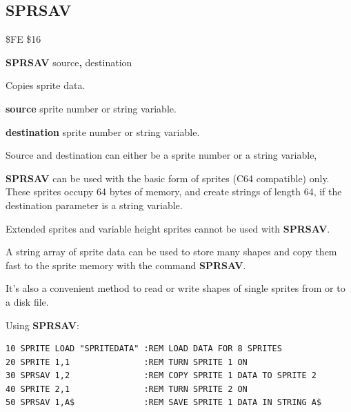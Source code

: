 
\newpage
\subsection{SPRSAV}
\begin{description}[leftmargin=2cm,style=nextline]
\item [Token:] \$FE \$16
\item [Format:] {\bf SPRSAV} source{\bf,} destination
\item [Usage:]  Copies sprite data.

                {\bf source} sprite number or string variable.

                {\bf destination} sprite number or string variable.

\item [Remarks:] Source and destination can either be
                a sprite number or a string variable,

                {\bf SPRSAV} can be used with the basic form of sprites
                (C64 compatible) only. These sprites occupy 64 bytes of memory,
                and create strings of length 64, if the destination
                parameter is a string variable.

                Extended sprites and variable height sprites
                cannot be used with {\bf SPRSAV}.

                A string array of sprite data can be used to store
                many shapes and copy them fast to the sprite memory
                with the command {\bf SPRSAV}.

                It's also a convenient method to read or write
                shapes of single sprites from or to a disk file.

\item [Example:] Using {\bf SPRSAV}:
\begin{tcolorbox}[colback=black,coltext=white]
\verbatimfont{\codefont}
\begin{verbatim}
10 SPRITE LOAD "SPRITEDATA" :REM LOAD DATA FOR 8 SPRITES
20 SPRITE 1,1               :REM TURN SPRITE 1 ON
30 SPRSAV 1,2               :REM COPY SPRITE 1 DATA TO SPRITE 2
40 SPRITE 2,1               :REM TURN SPRITE 2 ON
50 SPRSAV 1,A$              :REM SAVE SPRITE 1 DATA IN STRING A$
\end{verbatim}
\end{tcolorbox}
\end{description}

